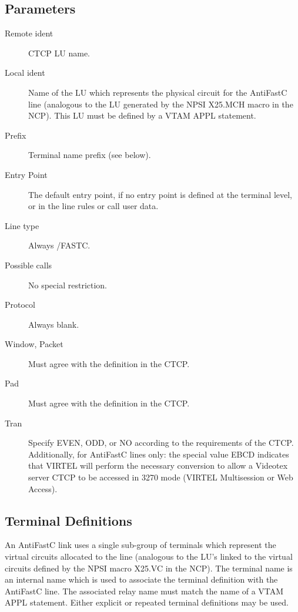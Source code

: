 \documentclass[letterpaper,10pt,english]{sphinxmanual}
\begin{document}
\subsection{Parameters}
\label{\detokenize{connectivity_guide:id37}}\label{\detokenize{connectivity_guide:index-79}}\begin{description}
\item[{Remote ident}] \leavevmode
CTCP LU name.

\item[{Local ident}] \leavevmode
Name of the LU which represents the physical circuit for the AntiFastC line (analogous to the LU generated by the NPSI X25.MCH macro in the NCP). This LU must be defined by a VTAM APPL statement.

\item[{Prefix}] \leavevmode
Terminal name prefix (see below).

\item[{Entry Point}] \leavevmode
The default entry point, if no entry point is defined at the terminal level, or in the line rules or call user data.

\item[{Line type}] \leavevmode
Always /FASTC.

\item[{Possible calls}] \leavevmode
No special restriction.

\item[{Protocol}] \leavevmode
Always blank.

\item[{Window, Packet}] \leavevmode
Must agree with the definition in the CTCP.

\item[{Pad}] \leavevmode
Must agree with the definition in the CTCP.

\item[{Tran}] \leavevmode
Specify EVEN, ODD, or NO according to the requirements of the CTCP. Additionally, for AntiFastC lines only: the special value EBCD indicates that VIRTEL will perform the necessary conversion to allow a Videotex server CTCP to be accessed in 3270 mode (VIRTEL Multisession or Web Access).

\end{description}


\subsection{Terminal Definitions}
\label{\detokenize{connectivity_guide:index-80}}\label{\detokenize{connectivity_guide:id38}}
An AntiFastC link uses a single sub-group of terminals which represent the virtual circuits allocated to the line (analogous to the LU’s linked to the virtual circuits defined by the NPSI macro X25.VC in the NCP). The terminal name is an internal name which is used to associate the terminal definition with the AntiFastC line. The associated relay name must match the name of a VTAM APPL statement. Either explicit or repeated terminal definitions may be used.
\end{document}
